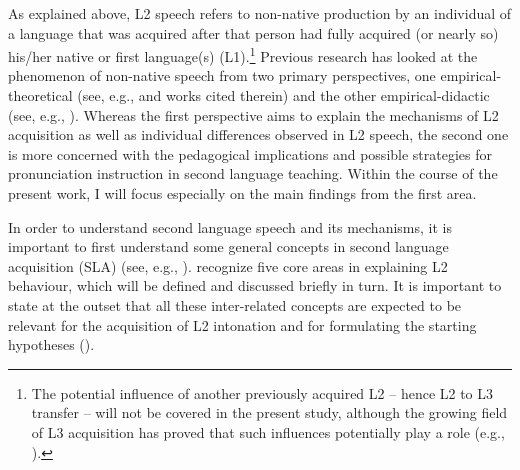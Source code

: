 As explained above, L2 speech refers to non-native production by an individual of a language that was acquired after that person had fully acquired (or nearly so) his/her native or first language(s) (L1).\footnote{The potential influence of another previously acquired L2 -- hence L2 to L3 transfer -- will not be covered in the present study, although the growing field of L3 acquisition has proved that such influences potentially play a role (e.g., \citealt{Odlin1989, CenozEtAl2001, HufeisenFouser2005, DeAngelis2007, Leung2009, WrembelEtAl2010, DeAngelisDewaele2011, GabrielGrünke2018}).} Previous research has looked at the phenomenon of non-native speech from two primary perspectives, one empirical-theoretical (see, e.g., \citealt{Hansen2006} and works cited therein) and the other empirical-didactic (see, e.g., \citealt{LightbownSpada2013}). Whereas the first perspective aims to explain the mechanisms of L2 acquisition as well as individual differences observed in L2 speech, the second one is more concerned with the pedagogical implications and possible strategies for pronunciation instruction in second language teaching. Within the course of the present work, I will focus especially on the main findings from the first area.


In order to understand second language speech and its mechanisms, it is important to first understand some general concepts in second language acquisition (SLA) (see, e.g., \citealt{Brown2000, GassSelinker2008, ColantoniEtAl2015, DerwingMunro2015, VanPattenBenati2015, AlonsoAlonso2018}). \citet[5--16]{TowellHawkins1994} recognize five core areas in explaining L2 behaviour, which will be defined and discussed briefly in turn. It is important to state at the outset that all these inter-related concepts are expected to be relevant for the acquisition of L2 intonation and for formulating the starting hypotheses ().



